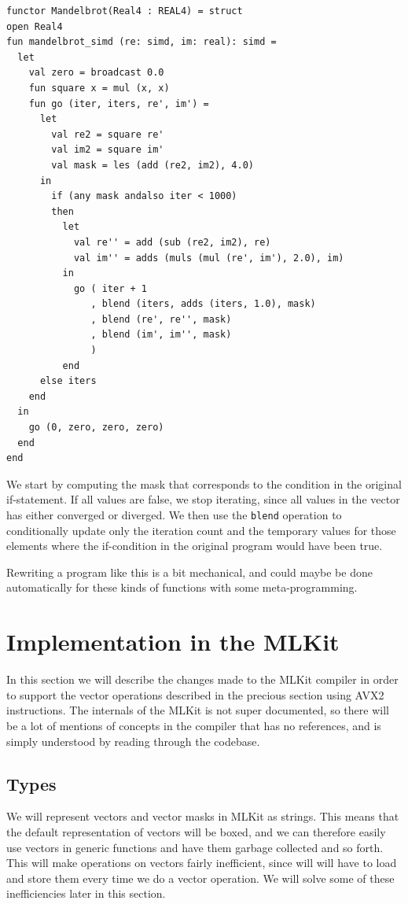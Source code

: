 \documentclass{article}
\begin{document}
\begin{lstlisting}[frame=single, label={lst:vector_mandel}, caption={Vector Mandelbrot}]
functor Mandelbrot(Real4 : REAL4) = struct
open Real4
fun mandelbrot_simd (re: simd, im: real): simd =
  let
    val zero = broadcast 0.0
    fun square x = mul (x, x)
    fun go (iter, iters, re', im') =
      let
        val re2 = square re'
        val im2 = square im'
        val mask = les (add (re2, im2), 4.0)
      in
        if (any mask andalso iter < 1000)
        then
          let 
            val re'' = add (sub (re2, im2), re)
            val im'' = adds (muls (mul (re', im'), 2.0), im)
          in
            go ( iter + 1
               , blend (iters, adds (iters, 1.0), mask)
               , blend (re', re'', mask)
               , blend (im', im'', mask)
               )
          end
      else iters
    end
  in
    go (0, zero, zero, zero)
  end
end
\end{lstlisting}
We start by computing the mask that corresponds to the condition in the original if-statement. If all values are false, we stop iterating, since all values in the vector has either converged or diverged. We then use the \verb!blend! operation to conditionally update only the iteration count and the temporary values for those elements where the if-condition in the original program would have been true.

Rewriting a program like this is a bit mechanical, and could maybe be done automatically for these kinds of functions with some meta-programming.

\section{Implementation in the MLKit}
In this section we will describe the changes made to the MLKit compiler in order to support the vector operations described in the precious section using AVX2 instructions. The internals of the MLKit is not super documented, so there will be a lot of mentions of concepts in the compiler that has no references, and is simply understood by reading through the codebase.

\subsection{Types}
We will represent vectors and vector masks in MLKit as strings. This means that the default representation of vectors will be boxed, and we can therefore easily use vectors in generic functions and have them garbage collected and so forth. This will make operations on vectors fairly inefficient, since will will have to load and store them every time we do a vector operation. We will solve some of these inefficiencies later in this section. 
\end{document}
